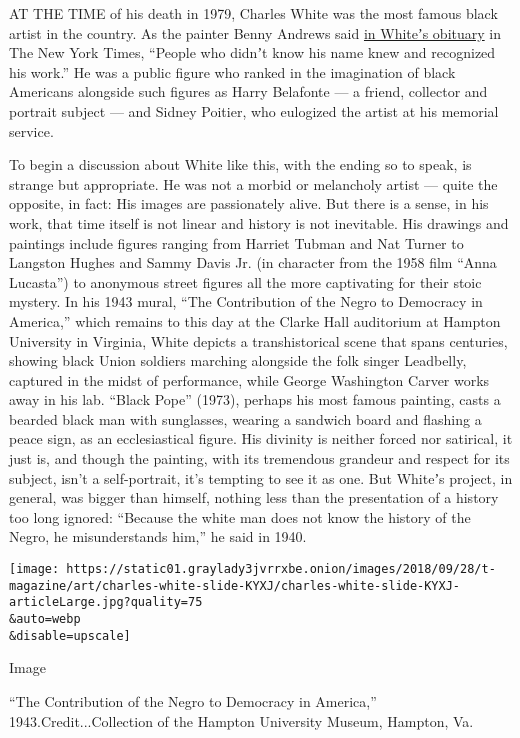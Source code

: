 AT THE TIME of his death in 1979, Charles White was the most famous
black artist in the country. As the painter Benny Andrews said
\href{https://www.nytimes3xbfgragh.onion/1979/10/06/archives/charles-w-white-is-dead-at-61-artist-with-work-in-49-museums.html}{in
Whiteʼs obituary} in The New York Times, ``People who didnʼt know his
name knew and recognized his work.'' He was a public figure who ranked
in the imagination of black Americans alongside such figures as Harry
Belafonte --- a friend, collector and portrait subject --- and Sidney
Poitier, who eulogized the artist at his memorial service.

To begin a discussion about White like this, with the ending so to
speak, is strange but appropriate. He was not a morbid or melancholy
artist --- quite the opposite, in fact: His images are passionately
alive. But there is a sense, in his work, that time itself is not linear
and history is not inevitable. His drawings and paintings include
figures ranging from Harriet Tubman and Nat Turner to Langston Hughes
and Sammy Davis Jr. (in character from the 1958 film ``Anna Lucasta'')
to anonymous street figures all the more captivating for their stoic
mystery. In his 1943 mural, ``The Contribution of the Negro to Democracy
in America,'' which remains to this day at the Clarke Hall auditorium at
Hampton University in Virginia, White depicts a transhistorical scene
that spans centuries, showing black Union soldiers marching alongside
the folk singer Leadbelly, captured in the midst of performance, while
George Washington Carver works away in his lab. ``Black Pope'' (1973),
perhaps his most famous painting, casts a bearded black man with
sunglasses, wearing a sandwich board and flashing a peace sign, as an
ecclesiastical figure. His divinity is neither forced nor satirical, it
just is, and though the painting, with its tremendous grandeur and
respect for its subject, isn't a self-portrait, it's tempting to see it
as one. But Whiteʼs project, in general, was bigger than himself,
nothing less than the presentation of a history too long ignored:
``Because the white man does not know the history of the Negro, he
misunderstands him,'' he said in 1940.

\texttt{[image: https://static01.graylady3jvrrxbe.onion/images/2018/09/28/t-magazine/art/charles-white-slide-KYXJ/charles-white-slide-KYXJ-articleLarge.jpg?quality=75\\\&auto=webp\\\&disable=upscale]}

Image

``The Contribution of the Negro to Democracy in America,''
1943.Credit...Collection of the Hampton University Museum, Hampton, Va.

